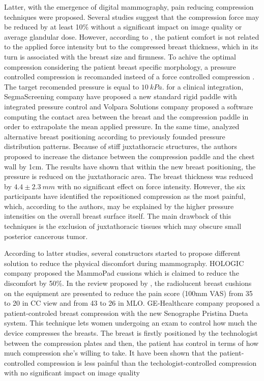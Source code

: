 Latter, with the emergence of  digital mammography, pain reducing compression techniques were proposed. Several studies \citep{chida_reduced_2009,saunders_effect_2008} suggest that the compression force may be reduced by at least 10\% without a significant impact on image quality or average glandular dose. However, according to \cite{poulos_breast_2003}, the patient comfort is not related to the applied force intensity but to the compressed breast thickness, which in its turn is associated with the breast size and firmness. To achive the optimal compression considering the patient breast specific morphology, a pressure controlled compression is recomanded insteed of a force controlled compression \citep{de_pain_2015}. The target recomended pressure is equal to $10\ kPa$. for a clinical integration, SegmaScreening company have proposed a new standard rigid paddle with integrated pressure control and Volpara Solutions company proposed a software computing the contact area between the breast and the compression paddle in order to extrapolate the mean applied pressure.  In the same time, \cite{dustler_effect_2012} analyzed alternative breast positioning according to previously founded pressure distribution patterns. Because of stiff juxtathoracic structures, the authors proposed to increase the distance between the compression paddle and the chest wall by 1cm. The results have shown that within the new breast positioning, the pressure is reduced on the juxtathoracic area. The breast thickness was reduced by $4.4\pm2.3 \ mm$ with no significant effect on force intensity. However, the six participants have identified the repositioned compression as the most painful, which, according to the authors, may be explained by the higher pressure  intensities on the overall breast surface itself.  The main drawback of this techniques is the exclusion of juxtathoracic tissues which may obscure small posterior cancerous tumor. 
 
According to latter studies, several constructors started to propose different solution to reduce the physical discomfort during mammography. HOLOGIC company proposed the MammoPad cussions which is claimed to reduce the discomfort by 50\%. In the review proposed by  \cite{miller_interventions_2008}, the radiolucent breast cushions on the equipment are presented to reduce the pain score (100mm VAS) from 35 to 20 in CC view and from 43 to 26 in MLO. GE-Healthcare company proposed a patient-controled breast compression with the new Senographe Pristina Dueta system. This technique lets women undergoing an exam to control how much the device compresses the breasts.  The breast is firstly positioned by the technologist between the compression plates and then, the patient has control in terms of how much compression she's willing to take. It have been shown that the patient-controlled compression is less painful than the techologist-controlled compression with no significant impact on image quality  \citep{miller_interventions_2008}

